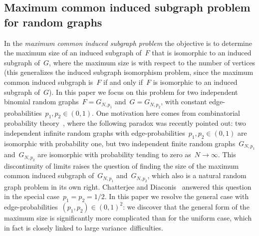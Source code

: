 \documentclass{article}
\begin{document}
\subsection{Maximum common induced subgraph problem for random graphs}\label{sec:introcommon} In the \emph{maximum common induced subgraph problem} the objective is to determine the maximum size of an induced subgraph of~$F$ that is isomorphic to an induced subgraph of~$G$, where the maximum size is with respect to the number of vertices (this generalizes the induced subgraph isomorphism problem, since the maximum common induced subgraph is~$F$ if and only if~$F$ is isomorphic to an induced subgraph of~$G$). 
In this paper we focus on this problem for two independent binomial random graphs~$F=G_{N,p_1}$ and~$G=G_{N,p_2}$, 
with constant edge-probabilities~$p_1,p_2 \in (0,1)$.
One motivation here comes 
from combinatorial probability theory~\cite{chatterjee2021isomorphisms}, where the following paradox was recently pointed out: 
two independent infinite random graphs with edge-probabilities~$p_1,p_2 \in (0,1)$ are isomorphic with probability one, 
but two independent finite random graphs~$G_{N,p_1}$ and~$G_{N,p_2}$ are isomorphic with probability tending to zero as~$N \to \infty$.
This discontinuity of limits raises the question of finding the size of the maximum common induced subgraph of~$G_{N,p_1}$ and~$G_{N,p_2}$, 
which also is a natural random graph problem in its own right. Chatterjee and Diaconis~\cite{chatterjee2021isomorphisms} answered this question in the special case~$p_1=p_2=1/2$. In this paper we resolve the general case with edge-probabilities~${(p_1,p_2) \in (0,1)^2}$: 
we discover that the general form of the maximum size is significantly more complicated than for the uniform case, 
which in fact is closely linked to large variance~difficulties. 
\end{document}
